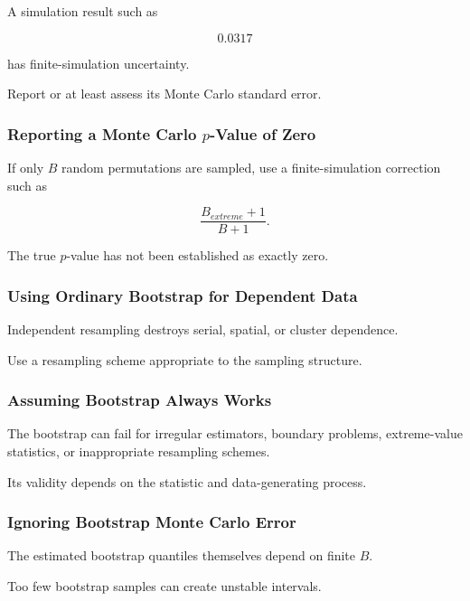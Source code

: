 A simulation result such as

\[
0.0317
\]

has finite-simulation uncertainty.

Report or at least assess its Monte Carlo standard error.

\subsubsection{Reporting a Monte Carlo \(p\)-Value of Zero}

If only \(B\) random permutations are sampled, use a finite-simulation
correction such as

\[
\boxed{
\frac{
B_{extreme}+1
}{
B+1
}.
}
\]

The true \(p\)-value has not been established as exactly zero.

\subsubsection{Using Ordinary Bootstrap for Dependent Data}

Independent resampling destroys serial, spatial, or cluster dependence.

Use a resampling scheme appropriate to the sampling structure.

\subsubsection{Assuming Bootstrap Always Works}

The bootstrap can fail for irregular estimators, boundary problems,
extreme-value statistics, or inappropriate resampling schemes.

Its validity depends on the statistic and data-generating process.

\subsubsection{Ignoring Bootstrap Monte Carlo Error}

The estimated bootstrap quantiles themselves depend on finite \(B\).

Too few bootstrap samples can create unstable intervals.


